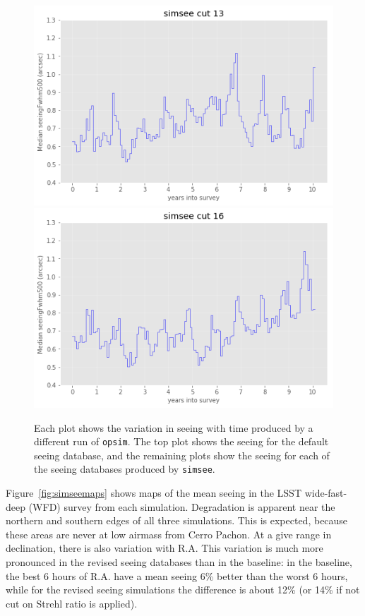 \documentclass[\docopts]{\docclass}
\begin{document}
\begin{figure}
\endminipage\hfill
{}
  \includegraphics[width=\columnwidth]{seeing_ss58779y13_v1_3_10yrs.png}
\endminipage\hfill
{}
  \includegraphics[width=\columnwidth]{seeing_ss58779y16_v1_3_10yrs.png}
\endminipage\hfill
  \caption{Each plot shows the variation in seeing with time
    produced by a different run of \texttt{opsim}. The top plot
    shows the seeing for the default seeing database, and the
    remaining plots show the seeing for each of the seeing databases
    produced by \texttt{simsee}.} 
  \label{fig:simseecomp}
\end{figure}

Figure~\ref{fig:simseemaps} shows maps of the mean seeing in the LSST
wide-fast-deep (WFD) survey from each simulation. Degradation is
apparent near the northern and southern edges of all three
simulations. This is expected, because these areas are never at low
airmass from Cerro Pachon. At a give range in declination, there is
also variation with R.A. This variation is much more pronounced in the
revised seeing databases than in the baseline: in the baseline, the
best 6 hours of R.A. have a mean seeing 6\% better than the worst 6
hours, while for the revised seeing simulations the difference is
about 12\% (or 14\% if not cut on Strehl ratio is applied). 
\end{document}
